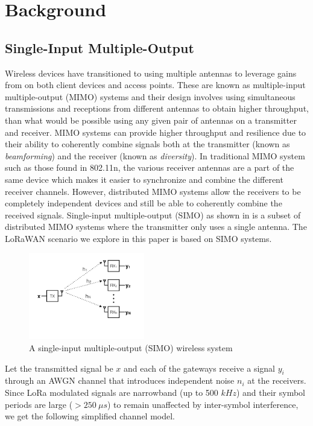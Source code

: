 \section{Background}
\label{sec:background}

\subsection{Single-Input Multiple-Output}
\label{sec:simo}

Wireless devices have transitioned to using multiple antennas to leverage
gains from on both client devices and access points. These are known as
multiple-input multiple-output (MIMO) systems and their design involves using
simultaneous transmissions and receptions from different antennas to obtain
higher throughput, than what would be possible using any given pair of
antennas on a transmitter and receiver. MIMO systems can provide higher
throughput and resilience due to their ability to coherently combine signals
both at the transmitter (known as \textit{beamforming}) and the receiver
(known as \textit{diversity}). In traditional MIMO system such as those found
in 802.11n, the various receiver antennas are a part of the same device which
makes it easier to synchronize and combine the different receiver channels.
However, distributed MIMO systems allow the receivers to be completely
independent devices and still be able to coherently combine the received
signals. Single-input multiple-output (SIMO) as shown in  is a
subset of distributed MIMO systems where the transmitter only uses a single
antenna. The LoRaWAN scenario we explore in this paper is based on SIMO
systems.

\begin{figure}[!htb]
    \centering
    \includegraphics[width=0.45\textwidth]{figures/SIMO}
    \caption{A single-input multiple-output (SIMO) wireless system}
    \label{fig:simo}
\end{figure}

Let the transmitted signal be $x$ and each of the gateways receive a signal
$y_i$ through an AWGN channel that introduces independent noise $n_i$ at the
receivers. Since LoRa modulated signals are narrowband (up to 500 $kHz$) and
their symbol periods are large ($> 250~\mu s$) to remain
unaffected by inter-symbol interference, we get the following simplified
channel model.

